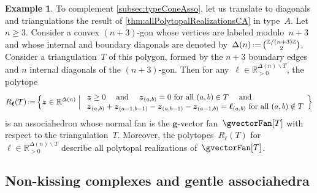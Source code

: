\documentclass{amsart}
\theoremstyle{definition}
\newtheorem{example}[theorem]{Example}
\newcommand{\R}{\mathbb{R}} %
\newcommand{\Z}{\mathbb{Z}} %
\renewcommand{\b}[1]{{\boldsymbol{#1}}} %
\newcommand{\Bigset}[2]{\Big\{ #1 \;\Big|\; #2 \Big\}} %
\newcommand{\ssm}{\smallsetminus} %
\newcommand{\eqdef}{\mbox{\,\raisebox{0.2ex}{\scriptsize\ensuremath{\mathrm:}}\ensuremath{=}\,}} %
\newcommand{\vincent}[1]{\todo[color=blue!30]{#1 \\ \hfill --- V.}}
\begin{document}
\begin{example}
To complement \cref{subsec:typeConeAsso}, let us translate to diagonals and triangulations the result of \cref{thm:allPolytopalRealizationsCA} in type~$A$.
Let~$n \ge 3$.
Consider a convex $(n+3)$-gon whose vertices are labeled modulo~$n+3$ and whose internal and boundary diagonals are denoted by~$\Delta(n) \eqdef \binom{\Z/(n+3)\Z}{2}$.
Consider a triangulation~$T$ of this polygon, formed by the $n+3$ boundary edges and $n$ internal diagonals of the $(n+3)$-gon.
Then for any~$\b{\ell} \in \R_{>0}^{\Delta(n) \ssm T}$, the polytope
\[
R_\b{\ell}(T) \eqdef \Bigset{\b{z} \in \R^{\Delta(n)}}{\begin{array}{l} \b{z} \ge 0 \quad\text{ and }\quad \b{z}_{(a,b)} = 0 \text{ for all } (a,b) \in T \quad\text{ and }\quad \\ \b{z}_{(a,b)} + \b{z}_{(a-1,b-1)} - \b{z}_{(a,b-1)} - \b{z}_{(a-1,b)} = \b{\ell}_{(a,b)} \text{ for all } (a,b) \notin T \end{array}}
\]
is an associahedron whose normal fan is the $\b{g}$-vector fan~$\gvectorFan[T]$ with respect to the triangulation~$T$.
Moreover, the polytopes~$R_\b{\ell}(T)$ for~$\b{\ell} \in \R_{>0}^{\Delta(n) \ssm T}$ describe all polytopal realizations of~$\gvectorFan[T]$.
\end{example}



\subsection{Non-kissing complexes and gentle associahedra}
\label{subsec:typeConeNKC}
\end{document}
